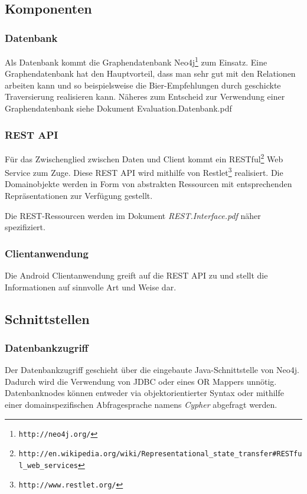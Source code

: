 \documentclass[10pt,a4paper]{scrartcl}
\begin{document}
\subsection{Komponenten}

\subsubsection{Datenbank}

Als Datenbank kommt die Graphendatenbank Neo4j\footnote{\texttt{http://neo4j.org/}} zum Einsatz.
Eine Graphendatenbank hat den Hauptvorteil, dass man sehr gut mit den Relationen arbeiten kann und
so beispielsweise die Bier-Empfehlungen durch geschickte Traversierung realisieren kann. Näheres zum Entscheid zur Verwendung einer Graphendatenbank siehe Dokument Evaluation.Datenbank.pdf

\subsubsection{REST API}

Für das Zwischenglied zwischen Daten und Client kommt ein
RESTful\footnote{\texttt{http://en.wikipedia.org/wiki/Representational\_state\_transfer\#RESTful\_web\_services}}
Web Service zum Zuge. Diese REST API wird mithilfe von
Restlet\footnote{\texttt{http://www.restlet.org/}} realisiert. Die Domainobjekte werden in Form von
abstrakten Ressourcen mit entsprechenden Repräsentationen zur Verfügung gestellt.

Die REST-Ressourcen werden im Dokument \textit{REST.Interface.pdf} näher spezifiziert.

\subsubsection{Clientanwendung}

Die Android Clientanwendung greift auf die REST API zu und stellt die Informationen auf sinnvolle
Art und Weise dar.


\subsection{Schnittstellen}

\subsubsection{Datenbankzugriff}

Der Datenbankzugriff geschieht über die eingebaute Java-Schnittstelle von Neo4j. Dadurch wird die
Verwendung von JDBC oder eines OR Mappers unnötig. Datenbanknodes können entweder via
objektorientierter Syntax oder mithilfe einer domainspezifischen Abfragesprache namens
\textit{Cypher} abgefragt werden.
\end{document}
